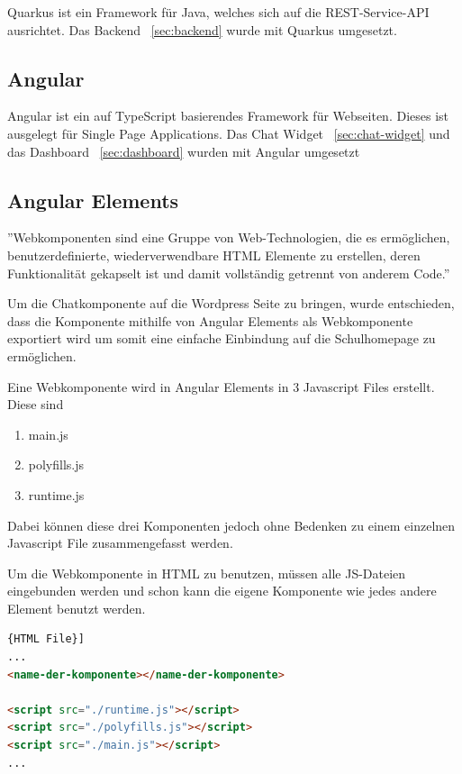 Quarkus ist ein Framework für Java, welches sich auf die REST-Service-API ausrichtet.
Das Backend ~\ref{sec:backend} wurde mit Quarkus umgesetzt.

\subsection{Angular}

Angular ist ein auf TypeScript basierendes Framework für Webseiten.
Dieses ist ausgelegt für Single Page Applications.
Das Chat Widget ~\ref{sec:chat-widget} und das Dashboard ~\ref{sec:dashboard} wurden mit Angular umgesetzt

\subsection{Angular Elements}\label{subsec:angular-elements}

''Webkomponenten sind eine Gruppe von Web-Technologien, die es ermöglichen, benutzerdefinierte, wiederverwendbare HTML Elemente zu erstellen, deren Funktionalität gekapselt ist und damit vollständig getrennt von anderem Code.''\cite{webcomponents}

Um die Chatkomponente auf die Wordpress Seite zu bringen, wurde entschieden, dass die Komponente mithilfe von Angular Elements als Webkomponente exportiert wird um somit eine einfache Einbindung auf die Schulhomepage zu ermöglichen.

Eine Webkomponente wird in Angular Elements in 3 Javascript Files erstellt.
Diese sind

\begin{enumerate}
    \item main.js
    \item polyfills.js
    \item runtime.js
\end{enumerate}

Dabei können diese drei Komponenten jedoch ohne Bedenken zu einem einzelnen Javascript File zusammengefasst werden.

Um die Webkomponente in HTML zu benutzen, müssen alle JS-Dateien eingebunden werden und schon kann die eigene Komponente wie jedes andere Element benutzt werden.

\begin{lstlisting}[language=html,label={lst:webcomponent},caption={HTML File}]{HTML File}]
...
<name-der-komponente></name-der-komponente>

<script src="./runtime.js"></script>
<script src="./polyfills.js"></script>
<script src="./main.js"></script>
...
\end{lstlisting}

